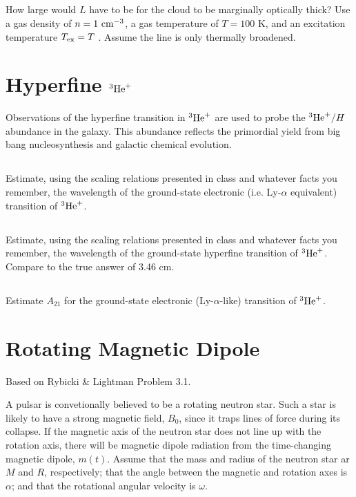 \documentclass[11pt]{article}
\begin{document}
\subsection{} %
How large would $L$ have to be for the cloud to be marginally optically
thick? Use a gas density of $n=1~{\rm cm}^{-3}$, a gas temperature of $T = 100$ K, and an
excitation temperature ${T_{\rm ex}} = T$ . Assume the line is only thermally broadened.


\def\He{{^3{\rm He}^+}}
\section{Hyperfine $\He$}

Observations of the hyperfine transition in $\He$ are used to probe the $\He/H$ abundance
in the galaxy.  This abundance reflects the primordial yield from big bang nucleosynthesis
and galactic chemical evolution.

\subsection{}
Estimate, using the scaling relations presented in class and whatever facts you
remember, the wavelength of the ground-state electronic (i.e. Ly-$\alpha$ equivalent) transition of $\He$.

\subsection{}
Estimate, using the scaling relations presented in class and whatever facts you
remember, the wavelength of the ground-state hyperfine transition of $\He$.  Compare
to the true answer of 3.46 cm.

\subsection{}
Estimate $A_{21}$ for the ground-state electronic (Ly-$\alpha$-like) transition of $\He$.

\section{Rotating Magnetic Dipole}

Based on Rybicki \& Lightman Problem 3.1.

A pulsar is convetionally believed to be a rotating neutron star.  Such
a star is likely to have a strong magnetic field, $B_0$, since it traps
lines of force during its collapse.  If the magnetic axis of the neutron
star does not line up with the rotation axis, there will be magnetic dipole
radiation from the time-changing magnetic dipole, $m(t)$.  Assume that the mass
and radius of the neutron star ar $M$ and $R$, respectively; that the angle
between the magnetic and rotation axes is $\alpha$; and that the rotational
angular velocity is $\omega$.
\end{document}
